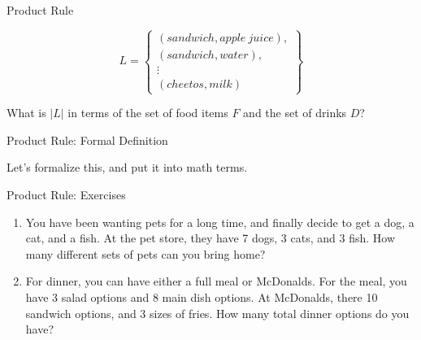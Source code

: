 \documentclass{beamer}
\begin{document}
\begin{frame}{Product Rule}
{{    \[L = \left\{\begin{array}{c}
        (sandwich, apple\ juice), \\
        (sandwich, water), \\
        \vdots \\
        (cheetos, milk)
    \end{array} \right\} \]
    
    What is $|L|$ in terms of the set of food items $F$ and the set of drinks $D$?
    }
    }
    
\end{frame}

\begin{frame}{Product Rule: Formal Definition}

Let's formalize this, and put it into math terms.\newline\newline
{}
\newline\newline
{}
\end{frame}

\begin{frame}{Product Rule: Exercises}
    \begin{enumerate}
        \item You have been wanting pets for a long time, and finally decide to get a dog, a cat, and a fish. At the pet store, they have 7 dogs, 3 cats, and 3 fish. How many different sets of pets can you bring home? 
        
        \item For dinner, you can have either a full meal or McDonalds. For the meal, you have 3 salad options and 8 main dish options. At McDonalds, there 10 sandwich options, and 3 sizes of fries. How many total dinner options do you have?
    \end{enumerate}
\end{frame}
\end{document}
